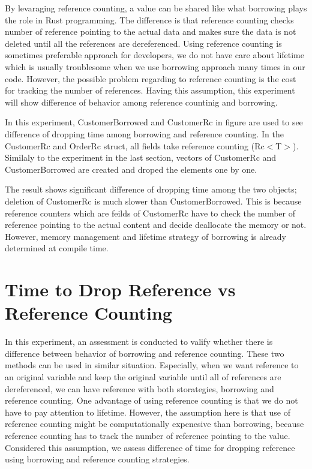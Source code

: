 By levaraging reference counting, a value can be shared like what borrowing plays the role in Rust programming. 
The difference is that reference counting checks number of reference pointing to the actual data and makes sure the data is not deleted 
until all the references are dereferenced. Using reference counting is sometimes preferable approach for developers, 
we do not have care about lifetime which is usually troublesome when we use borrowing approach many times in our code. 
However, the possible problem regarding to reference counting is the cost for tracking the number of references. 
Having this assumption, this experiment will show difference of behavior among reference countinig and borrowing.

In this experiment, CustomerBorrowed and CustomerRc in figure are used to see difference of dropping time among borrowing and reference counting. 
In the CustomerRc and OrderRc struct, all fields take reference counting (Rc$<$T$>$). Similaly to the experiment in the last section, 
vectors of CustomerRc and CustomerBorrowed are created and droped the elements one by one. 

The result shows significant difference of dropping time among the two objects; deletion of CustomerRc is much slower than CustomerBorrowed. 
This is because reference counters which are feilds of CustomerRc have to check the number of reference pointing to the actual content and decide 
deallocate the memory or not. However, memory management and lifetime strategy of borrowing is already determined at compile time.

\section{Time to Drop Reference vs Reference Counting}
\label{sec:history}
In this experiment, an assessment is conducted to valify whether there is difference between behavior of borrowing and reference counting. 
These two methods can be used in similar situation. Especially, when we want reference to an original variable and keep the original variable until all of references are dereferenced, 
we can have reference with both storategies, borrowing and reference counting. One advantage of using reference counting is that we do not have to pay attention to lifetime.
However, the assumption here is that use of reference counting might be computationally expenesive than borrowing, because reference counting has to track the number of reference pointing to the value. 
Considered this assumption, we assess difference of time for dropping reference using borrowing and reference counting strategies. 

